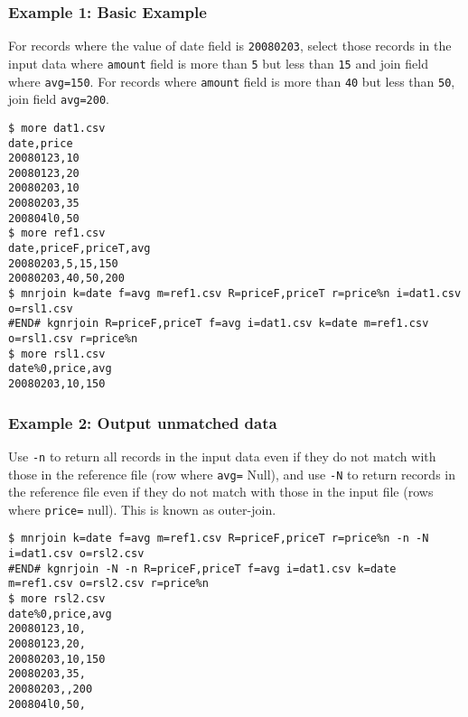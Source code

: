 \subsubsection*{Example 1: Basic Example}

For records where the value of date field is \verb|20080203|, select those records in the input data where \verb|amount| field is more than \verb|5| but less than \verb|15| and join field where \verb|avg=150|. For records where \verb|amount| field is more than \verb|40| but less than \verb|50|, join field \verb|avg=200|.


\begin{Verbatim}[baselinestretch=0.7,frame=single]
$ more dat1.csv
date,price
20080123,10
20080123,20
20080203,10
20080203,35
200804l0,50
$ more ref1.csv
date,priceF,priceT,avg
20080203,5,15,150
20080203,40,50,200
$ mnrjoin k=date f=avg m=ref1.csv R=priceF,priceT r=price%n i=dat1.csv o=rsl1.csv
#END# kgnrjoin R=priceF,priceT f=avg i=dat1.csv k=date m=ref1.csv o=rsl1.csv r=price%n
$ more rsl1.csv
date%0,price,avg
20080203,10,150
\end{Verbatim}
\subsubsection*{Example 2: Output unmatched data}

Use \verb|-n| to return all records in the input data even if they do not match with those in the reference file (row where \verb|avg=| Null), and use \verb|-N| to return records in the reference file even if they do not match with those in the input file (rows where \verb|price=| null). This is known as outer-join.


\begin{Verbatim}[baselinestretch=0.7,frame=single]
$ mnrjoin k=date f=avg m=ref1.csv R=priceF,priceT r=price%n -n -N i=dat1.csv o=rsl2.csv
#END# kgnrjoin -N -n R=priceF,priceT f=avg i=dat1.csv k=date m=ref1.csv o=rsl2.csv r=price%n
$ more rsl2.csv
date%0,price,avg
20080123,10,
20080123,20,
20080203,10,150
20080203,35,
20080203,,200
200804l0,50,
\end{Verbatim}
